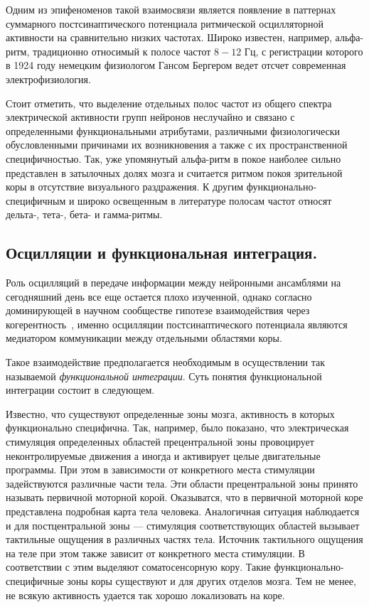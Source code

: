 Одним из эпифеноменов такой взаимосвязи является появление в паттернах
суммарного постсинаптического потенциала ритмической осцилляторной активности
на сравнительно низких частотах.  Широко известен, например, альфа-ритм,
традиционно относимый к полосе частот $8-12$ Гц, с регистрации которого в 1924
году немецким физиологом Гансом Бергером ведет отсчет современная
электрофизиология.

Стоит отметить, что выделение отдельных полос частот из общего спектра
электрической активности групп нейронов неслучайно и связано с определенными
функциональными атрибутами, различными физиологически обусловленными причинами
их возникновения а также с их пространственной специфичностью.  Так, уже
упомянутый альфа-ритм в покое наиболее сильно представлен в затылочных долях
мозга и считается ритмом покоя зрительной коры в отсутствие визуального
раздражения.  К другим функционально-специфичным и широко освещенным в
литературе полосам частот относят дельта-, тета-, бета- и гамма-ритмы.

\subsection{Осцилляции и функциональная интеграция.}
Роль осцилляций в передаче информации между нейронными ансамблями на
сегодняшний день все еще остается плохо изученной, однако согласно доминирующей
в научном сообществе гипотезе взаимодействия через когерентность~\cite{Fries2015},
именно осцилляции постсинаптического потенциала являются медиатором
коммуникации между отдельными областями коры.

Такое взаимодействие предполагается необходимым в осуществлении так называемой
\emph{функциональной интеграции}. Суть понятия функциональной интеграции
состоит в следующем.

Известно, что существуют определенные зоны мозга, активность в которых
функционально специфична.  Так, например, было показано, что электрическая
стимуляция определенных областей прецентральной зоны провоцирует
неконтролируемые движения а иногда и активирует целые двигательные программы.
При этом в зависимости от конкретного места стимуляции задействуются различные
части тела.  Эти области прецентральной зоны принято называть первичной
моторной корой.  Оказыватся, что в первичной моторной коре представлена
подробная карта тела человека.  Аналогичная ситуация наблюдается и для
постцентральной зоны --- стимуляция соответствующих областей вызывает
тактильные ощущения в различных частях тела. Источник тактильного ощущения на
теле при этом также зависит от конкретного места стимуляции. В соответствии с
этим выделяют соматосенсорную кору. Такие функционально-специфичные зоны коры
существуют и для других отделов мозга. Тем не менее, не всякую активность
удается так хорошо локализовать на коре.


